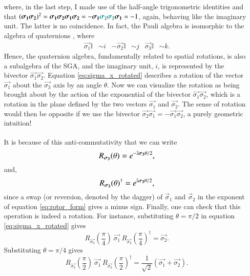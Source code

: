 where, in the last step, I made use of the half-angle trigonometric identities and that $ (\vec{\sigma_1} \vec{\sigma_2} )^2 = \vec{\sigma_1} \vec{\sigma_2} \vec{\sigma_1} \vec{\sigma_2} = - \vec{\sigma_1} \color{teal} \vec{\sigma_2} \vec{\sigma_2} \color{black} \vec{\sigma_1} = -1 $, again, behaving like the imaginary unit. The latter is no coincidence. In fact, the Pauli algebra is isomorphic to the algebra of quaternions \cite{dressel_spacetime_2015}, where 
\begin{align*}
    \vec{\sigma_1} \mathbb{I} &\sim i &
    -\vec{\sigma_2} \mathbb{I} & \sim j &
    \vec{\sigma_3} \mathbb{I} &\sim k.
\end{align*}    
Hence, the quaternion algebra, fundamentally related to spatial rotations, is also a subalgebra of the SGA, and the imaginary unit, $i$, is represented by the bivector $\vec{\sigma_1} \vec{\sigma_2}$. Equation \eqref{eq:sigma_x_rotated} describes a rotation of the vector $\vec{\sigma_1}$ about the $\vec{\sigma_3}$ axis by an angle $\theta$. Now we can visualize the rotation as being brought about by the action of the exponential of the bivector $\vec{\sigma_1} \vec{\sigma_2}$, which is a rotation in the plane defined by the two vectors $\vec{\sigma_1}$ and $\vec{\sigma_2}$. The sense of rotation would then be opposite if we use the bivector $\vec{\sigma_2} \vec{\sigma_1} =-  \vec{\sigma_1} \vec{\sigma_2}$, a purely geometric intuition! 
\\ \\ 
It is because of this anti-commutativity that we can write 
\begin{equation} \label{eq:rotor_form}
    \large R_{\vec{\sigma_3}}(\theta) =  \exp{ -\mathbb{I} \vec{\sigma_3} \theta / 2},
\end{equation}
and,
\begin{equation} \label{eq:rotor_form_reversed}
    \large R_{\vec{\sigma_3}}(\theta)^\dagger =  \exp{ \mathbb{I} \vec{\sigma_3} \theta / 2},
\end{equation}
since a swap (or reversion, denoted by the dagger) of $\vec{\sigma}_1$ and $\vec{\sigma}_2$ in the exponent of equation \eqref{eq:rotor_form} gives a minus sign. Finally, one can check that this operation is indeed a rotation. For instance, substituting $\theta = \pi/2$ in equation \eqref{eq:sigma_x_rotated} gives
$$ R_{\vec{\sigma_3}} \left( \frac{\pi}{4} \right) \ \vec{\sigma_1}  \ R_{\vec{\sigma_3}} \left(  \frac{\pi}{4} \right)^\dagger =  \vec{\sigma_2}. $$
Substituting $\theta = \pi/4$ gives
$$ R_{\vec{\sigma_3}} \left( \frac{\pi}{2} \right) \ \vec{\sigma_1}  \ R_{\vec{\sigma_3}} \left(  \frac{\pi}{2} \right)^\dagger =  \frac{1}{\sqrt{2}} \left( \vec{\sigma_1} + \vec{\sigma_2} \right). $$
